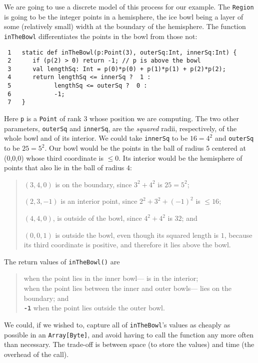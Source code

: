 We are going to use a discrete model of this process for our example. 
The {\tt Region} is going to be the integer points in a hemisphere, the ice bowl
being a layer of some (relatively small) width at the boundary of the
hemisphere. The function {\tt inTheBowl} differentiates the points in the bowl
from those not:
\begin{verbatim}
 1   static def inTheBowl(p:Point(3), outerSq:Int, innerSq:Int) {
 2      if (p(2) > 0) return -1; // p is above the bowl
 3      val lengthSq: Int = p(0)*p(0) + p(1)*p(1) + p(2)*p(2);   
 4      return lengthSq <= innerSq ?  1 :
 5            lengthSq <= outerSq ?  0 :
 6            -1;
 7   }
 \end{verbatim}
Here {\tt p} is a {\tt Point} of rank 3 whose position we are computing.  
The two other parameters, {\tt outerSq} and {\tt innerSq},
are the {\em squared} radii, respectively, of the whole bowl and of its
interior. 
We could take {\tt innerSq} to be $16 =
4^2$ and {\tt outerSq} to be $25 = 5^2$.  Our bowl would be the points in the ball
of radius $5$ centered at (0,0,0) whose third coordinate is $\leq 0$.  Its
interior would be the hemisphere of points that also lie in the ball of radius
$4$:
\eg{}
\begin{quote}
$(3,4,0)$ is on the boundary, since $3^2 + 4^2$ is $25 = 5^2$; 

$(2,3,-1)$ is an interior point, since $2^2 + 3^2 + (-1)^2$ is
$\leq 16$; 

$(4,4,0)$, is outside of the bowl, since $4^2 + 4^2$ is $32$; and

$(0, 0, 1)$ is outside the bowl, even though its squared length is $1$, because
its third coordinate is positive, and therefore it lies above the bowl.
\end{quote}
The return values of {\tt inTheBowl()} are
\begin{quote}
\hspace{1em} when the point lies in the inner
bowl---\ie{} is in the interior;\\ 
\hspace{1em} when the point lies between the inner
and outer bowls---\ie{} lies on the boundary;  and\\
{\tt {\bf -1}}\hspace{1em} when the point lies outside the outer bowl. 
\end{quote}
We could, if we wished to, capture all of {\tt inThe\-Bowl}'s values as cheaply
as possible in an {\tt Array[Byte]}, and avoid having to call the function any
more often than necessary.  The trade-off is between space (to store the
values) and time (the overhead of the call).

